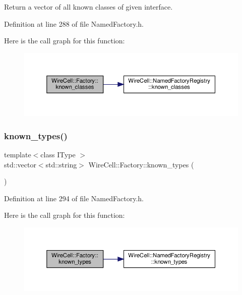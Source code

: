 Return a vector of all known classes of given interface. 



Definition at line 288 of file Named\+Factory.\+h.

Here is the call graph for this function\+:
\nopagebreak
\begin{figure}[H]
\begin{center}
\leavevmode
\includegraphics[width=350pt]{namespace_wire_cell_1_1_factory_abfc39deedef2d6c44f0c9af364bcdd2d_cgraph}
\end{center}
\end{figure}
\mbox{\label{namespace_wire_cell_1_1_factory_aedc58cf1d2d6c0e60586e95fd415f96e}} 
\subsubsection{\texorpdfstring{known\+\_\+types()}{known\_types()}}
{\footnotesize\ttfamily template$<$class I\+Type $>$ \\
std\+::vector$<$std\+::string$>$ Wire\+Cell\+::\+Factory\+::known\+\_\+types (\begin{DoxyParamCaption}{ }\end{DoxyParamCaption})}



Definition at line 294 of file Named\+Factory.\+h.

Here is the call graph for this function\+:
\nopagebreak
\begin{figure}[H]
\begin{center}
\leavevmode
\includegraphics[width=350pt]{namespace_wire_cell_1_1_factory_aedc58cf1d2d6c0e60586e95fd415f96e_cgraph}
\end{center}
\end{figure}
\mbox{\label{namespace_wire_cell_1_1_factory_a17712091b6e64cd7936ec21901b32b39}} 
